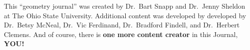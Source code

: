 \documentclass[handout,numbers,nooutcomes,hints]{../ximera}
\begin{document}
%
%
%
%
%






This ``geometry journal'' was created by Dr.\ Bart Snapp and
Dr.\ Jenny Sheldon at The Ohio State University. Additional content
was developed by developed by Dr.\ Betsy McNeal, Dr.\ Vic Ferdinand,
Dr.\ Bradford Findell, and Dr.\ Herbert Clemens.  And of course, there
is \textbf{one more content creator} in this Journal, \textbf{YOU!}
\end{document}
